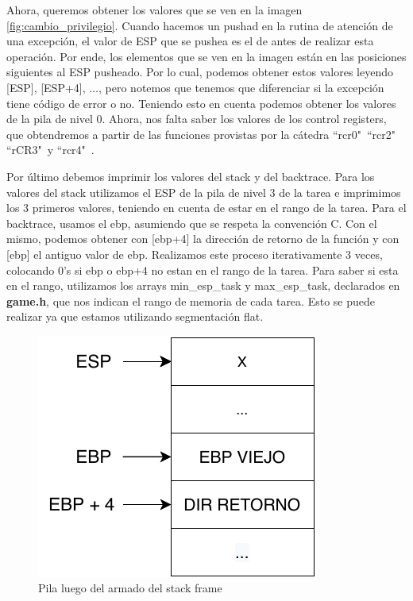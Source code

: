 \documentclass[a4paper]{article}
\begin{document}
\justify
Ahora, queremos obtener los valores que se ven en la imagen \ref{fig:cambio_privilegio}. Cuando hacemos un pushad en la rutina de atención de una excepción, el valor de ESP que se pushea es el de antes de realizar esta operación. Por ende, los elementos que se ven en la imagen están en las posiciones siguientes al ESP pusheado. Por lo cual, podemos obtener estos valores leyendo [ESP], [ESP+4], $\dots$, pero notemos que tenemos que diferenciar si la excepción tiene código de error o no. Teniendo esto en cuenta podemos obtener los valores de la pila de nivel 0. Ahora, nos falta saber los valores de los control registers, que obtendremos a partir de las funciones provistas por la cátedra ``rcr0"\, ``rcr2"\, ``rCR3"\ y ``rcr4"\ .


\justify
Por último debemos imprimir los valores del stack y del backtrace. Para los valores del stack utilizamos el ESP de la pila de nivel $3$ de la tarea e imprimimos los $3$ primeros valores, teniendo en cuenta de estar en el rango de la tarea. Para el backtrace, usamos el ebp, asumiendo que se respeta la convención C. Con el mismo, podemos obtener con [ebp+4] la dirección de retorno de la función y con [ebp] el antiguo valor de ebp. Realizamos este proceso iterativamente 3 veces, colocando 0's si ebp o ebp+4 no estan en el rango de la tarea. Para saber si esta en el rango, utilizamos los arrays min_esp_task y max_esp_task, declarados en \textbf{game.h}, que nos indican el rango de memoria de cada tarea. Esto se puede realizar ya que estamos utilizando segmentación flat.

\begin{figure}[h]
	\centering
	\includegraphics[scale=0.8]{img/pila.pdf}
	\caption{Pila luego del armado del stack frame}
\end{figure}
\end{document}
